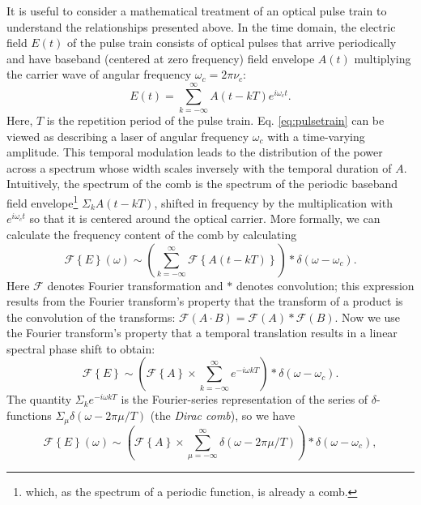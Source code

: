 It is useful to consider a mathematical treatment of an optical pulse train to understand the relationships presented above. In the time domain, the electric field $E(t)$ of the pulse train consists of optical pulses that arrive periodically and have baseband (centered at zero frequency) field envelope $A(t)$ multiplying the carrier wave of angular frequency $\omega_c=2\pi\nu_c$:
\begin{equation}
E(t)=\sum_{k=-\infty}^{\infty} A(t-kT)e^{i\omega_c t}. \label{eq:pulsetrain}
\end{equation}
Here, $T$ is the repetition period of the pulse train. Eq. \ref{eq:pulsetrain} can be viewed as describing a laser of angular frequency $\omega_c$ with a time-varying amplitude. This temporal modulation leads to the distribution of the power across a spectrum whose width scales inversely with the temporal duration of $A$. Intuitively, the spectrum of the comb is the spectrum of the periodic baseband field envelope\footnote{which, as the spectrum of a periodic function, is already a comb.} $\Sigma_k A(t-kT)$, shifted in frequency by the multiplication with $e^{i\omega_c t}$ so that it is centered around the optical carrier. More formally, we can calculate the frequency content of the comb by calculating
\begin{equation}
\mathcal{F}\left\{E\right\}(\omega)\sim\left(\sum_{k=-\infty}^{\infty}\mathcal{F}\left\{A(t-kT)\right\}\right)*\delta(\omega-\omega_c).
\end{equation}
Here $\mathcal{F}$ denotes Fourier transformation and $*$ denotes convolution; this expression results from the Fourier transform's property that the transform of a product is the convolution of the transforms: $\mathcal{F}(A\cdot B)=\mathcal{F}(A)*\mathcal{F}(B)$. Now we use the Fourier transform's property that a temporal translation results in a linear spectral phase shift to obtain:
\begin{equation}
\mathcal{F}\left\{E\right\}\sim\left(\mathcal{F}\left\{A\right\}\times\sum_{k=-\infty}^{\infty}e^{-i\omega kT}\right)*\delta(\omega-\omega_c).
\end{equation}
The quantity $\Sigma_ke^{-i\omega kT}$ is the Fourier-series representation of the series of $\delta$-functions \mbox{$\Sigma_\mu\delta(\omega-2\pi\mu/T)$} (the \textit{Dirac comb}), so we have
\begin{equation}
\mathcal{F}\left\{E\right\}(\omega)\sim\left(\mathcal{F}\left\{A\right\}\times\sum_{\mu=-\infty}^{\infty}\delta\left(\omega-2\pi \mu/T\right)\right)*\delta(\omega-\omega_c),
\end{equation}

